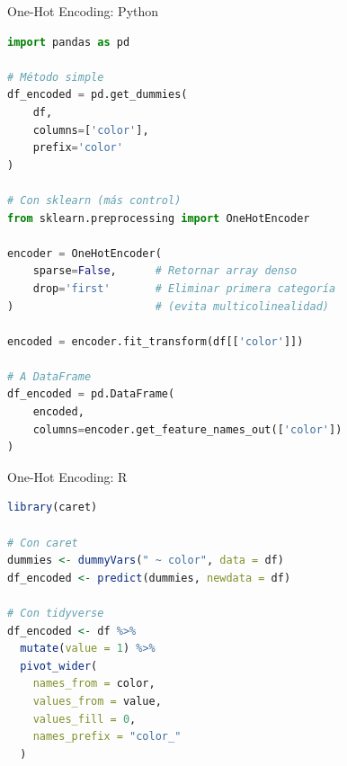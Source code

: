 \documentclass[aspectratio=169]{beamer}
\begin{document}
\begin{frame}[fragile]{One-Hot Encoding: Python}
\begin{lstlisting}[language=Python]
import pandas as pd

# Método simple
df_encoded = pd.get_dummies(
    df, 
    columns=['color'], 
    prefix='color'
)

# Con sklearn (más control)
from sklearn.preprocessing import OneHotEncoder

encoder = OneHotEncoder(
    sparse=False,      # Retornar array denso
    drop='first'       # Eliminar primera categoría 
)                      # (evita multicolinealidad)

encoded = encoder.fit_transform(df[['color']])

# A DataFrame
df_encoded = pd.DataFrame(
    encoded,
    columns=encoder.get_feature_names_out(['color'])
)
\end{lstlisting}
\end{frame}

\begin{frame}[fragile]{One-Hot Encoding: R}
\begin{lstlisting}[language=R]
library(caret)

# Con caret
dummies <- dummyVars(" ~ color", data = df)
df_encoded <- predict(dummies, newdata = df)

# Con tidyverse
df_encoded <- df %>%
  mutate(value = 1) %>%
  pivot_wider(
    names_from = color, 
    values_from = value, 
    values_fill = 0,
    names_prefix = "color_"
  )
\end{lstlisting}
\end{frame}
\end{document}
